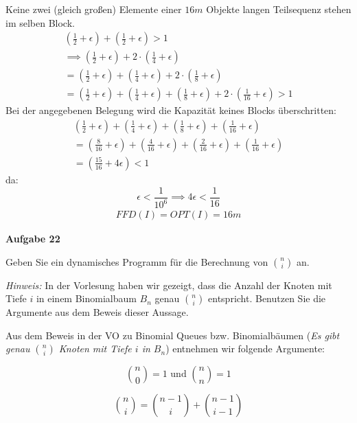 \documentclass{article}
\begin{document}
Keine zwei (gleich großen) Elemente einer $16m$ Objekte langen Teilsequenz stehen im selben Block.
\begin{align*}
(\frac{1}{2}+\epsilon)+(\frac{1}{2}+\epsilon) > 1\\
\implies (\frac{1}{2}+\epsilon)+2\cdot(\frac{1}{4}+\epsilon)\\ 
=(\frac{1}{2}+\epsilon)+(\frac{1}{4}+\epsilon)+2\cdot(\frac{1}{8}+\epsilon)\\
=(\frac{1}{2}+\epsilon)+(\frac{1}{4}+\epsilon)+(\frac{1}{8}+\epsilon)+2\cdot(\frac{1}{16}+\epsilon) > 1
\end{align*}
\newpage
Bei der angegebenen Belegung wird die Kapazität keines Blocks überschritten:\\
\begin{align*}
(\frac{1}{2}+\epsilon)+(\frac{1}{4}+\epsilon)+(\frac{1}{8}+\epsilon)+(\frac{1}{16}+\epsilon)\\
=(\frac{8}{16}+\epsilon)+(\frac{4}{16}+\epsilon)+(\frac{2}{16}+\epsilon)+(\frac{1}{16}+\epsilon)\\
=(\frac{15}{16}+4\epsilon)<1 
\end{align*}
da:\\
\begin{equation}
	\epsilon<\frac{1}{10^{6}} \implies 4\epsilon<\frac{1}{16}
\end{equation}
\begin{align*}
FFD(I)=OPT(I)=16m
\end{align*}

\clearpage%

{\bfseries Aufgabe 22}%

Geben Sie ein dynamisches Programm f{\"u}r die Berechnung von $\binom{n}{i}$ an.

\emph{Hinweis:} In der Vorlesung haben wir gezeigt, dass die Anzahl der Knoten
mit Tiefe $i$ in einem Binomialbaum $B_n$ genau $\binom{n}{i}$ entspricht.
Benutzen Sie die Argumente aus dem Beweis dieser Aussage.

Aus dem Beweis in der VO zu Binomial Queues bzw. Binomialb{\"a}umen
(\emph{Es gibt genau $\binom{n}{i}$ Knoten mit Tiefe $i$ in $B_n$}) entnehmen
wir folgende Argumente:

\begin{equation}
\binom{n}{0} = 1 \text{ und } \binom{n}{n} = 1
\end{equation}

\begin{equation}
\binom{n}{i} = \binom{n - 1}{i} + \binom{n - 1}{i - 1}
\end{equation}
\end{document}
